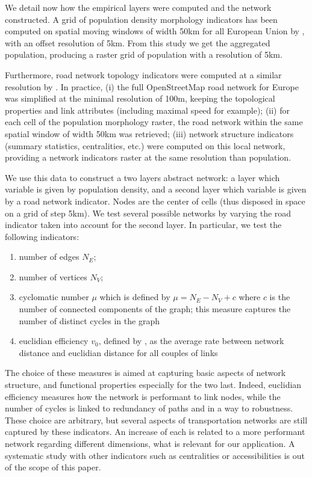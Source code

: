 \documentclass{jimis-en}
\begin{document}
We detail now how the empirical layers were computed and the network constructed. A grid of population density morphology indicators has been computed on spatial moving windows of width 50km for all European Union by \cite{raimbault2018calibration}, with an offset resolution of 5km. From this study we get the aggregated population, producing a raster grid of population with a resolution of 5km.

Furthermore, road network topology indicators were computed at a similar resolution by \cite{raimbault2018urban}. In practice, (i) the full OpenStreetMap road network for Europe was simplified at the minimal resolution of 100m, keeping the topological properties and link attributes (including maximal speed for example); (ii) for each cell of the population morphology raster, the road network within the same spatial window of width 50km was retrieved; (iii) network structure indicators (summary statistics, centralities, etc.) were computed on this local network, providing a network indicators raster at the same resolution than population.

We use this data to construct a two layers abstract network: a layer which variable is given by population density, and a second layer which variable is given by a road network indicator. Nodes are the center of cells (thus disposed in space on a grid of step 5km). We test several possible networks by varying the road indicator taken into account for the second layer. In particular, we test the following indicators:
\begin{enumerate}
	\item number of edges $N_E$;
	\item number of vertices $N_V$;
	\item cyclomatic number $\mu$ which is defined by $\mu = N_E - N_V + c$ where $c$ is the number of connected components of the graph; this measure captures the number of distinct cycles in the graph
	\item euclidian efficiency $v_0$, defined by \cite{banos2012towards}, as the average rate between network distance and euclidian distance for all couples of links
\end{enumerate}

The choice of these measures is aimed at capturing basic aspects of network structure, and functional properties especially for the two last. Indeed, euclidian efficiency measures how the network is performant to link nodes, while the number of cycles is linked to redundancy of paths and in a way to robustness. These choice are arbitrary, but several aspects of transportation networks are still captured by these indicators. An increase of each is related to a more performant network regarding different dimensions, what is relevant for our application. A systematic study with other indicators such as centralities or accessibilities is out of the scope of this paper.
\end{document}
